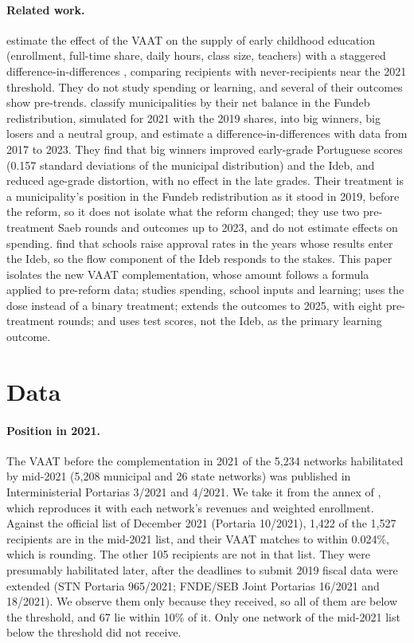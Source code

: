\documentclass[11pt]{article}
\begin{document}
\paragraph{Related work.} \citet{franca2026} estimate the effect of the VAAT on the supply of early childhood education (enrollment, full-time share, daily hours, class size, teachers) with a staggered difference-in-differences \citep{callaway2021}, comparing recipients with never-recipients near the 2021 threshold. They do not study spending or learning, and several of their outcomes show pre-trends. \citet{lima2025fundeb} classify municipalities by their net balance in the Fundeb redistribution, simulated for 2021 with the 2019 shares, into big winners, big losers and a neutral group, and estimate a difference-in-differences with data from 2017 to 2023. They find that big winners improved early-grade Portuguese scores (0.157 standard deviations of the municipal distribution) and the Ideb, and reduced age-grade distortion, with no effect in the late grades. Their treatment is a municipality's position in the Fundeb redistribution as it stood in 2019, before the reform, so it does not isolate what the reform changed; they use two pre-treatment Saeb rounds and outcomes up to 2023, and do not estimate effects on spending. \citet{lima2025ideb} find that schools raise approval rates in the years whose results enter the Ideb, so the flow component of the Ideb responds to the stakes. This paper isolates the new VAAT complementation, whose amount follows a formula applied to pre-reform data; studies spending, school inputs and learning; uses the dose instead of a binary treatment; extends the outcomes to 2025, with eight pre-treatment rounds; and uses test scores, not the Ideb, as the primary learning outcome.

\section{Data}\label{sec:dados}

\paragraph{Position in 2021.} The VAAT before the complementation in 2021 of the 5,234 networks habilitated by mid-2021 (5,208 municipal and 26 state networks) was published in Interministerial Portarias 3/2021 and 4/2021. We take it from the annex of \citet{tanno2021}, which reproduces it with each network's revenues and weighted enrollment. Against the official list of December 2021 (Portaria 10/2021), 1,422 of the 1,527 recipients are in the mid-2021 list, and their VAAT matches to within 0.024\%, which is rounding. The other 105 recipients are not in that list. They were presumably habilitated later, after the deadlines to submit 2019 fiscal data were extended (STN Portaria 965/2021; FNDE/SEB Joint Portarias 16/2021 and 18/2021). We observe them only because they received, so all of them are below the threshold, and 67 lie within 10\% of it. Only one network of the mid-2021 list below the threshold did not receive.
\end{document}
